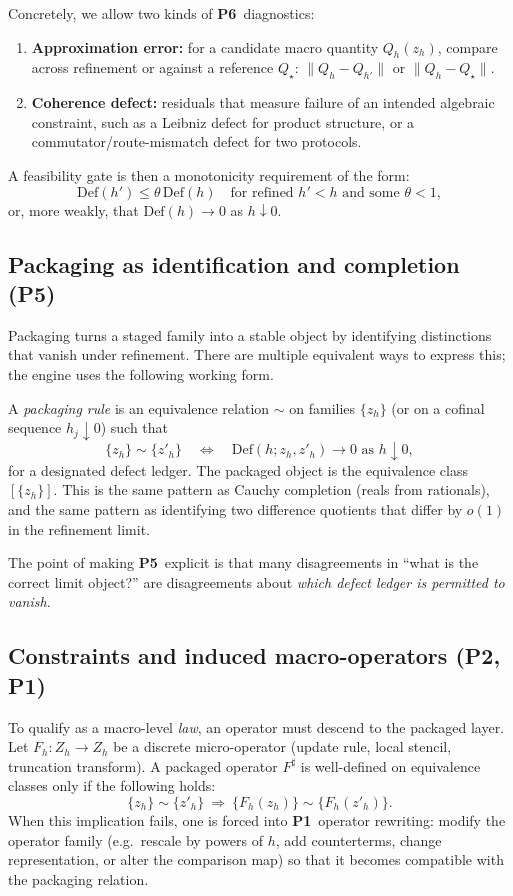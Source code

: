 \documentclass[apajournal,article,submit,moreauthors,pdftex]{Definitions/mdpi}
\newcommand{\Pone}{\textbf{P1}}
\newcommand{\Ptwo}{\textbf{P2}}
\newcommand{\Pfive}{\textbf{P5}}
\newcommand{\Psix}{\textbf{P6}}
\begin{document}
Concretely, we allow two kinds of \Psix\ diagnostics:
\begin{enumerate}
  \item \textbf{Approximation error:} for a candidate macro quantity $Q_h(z_h)$, compare across refinement or against a reference $Q_\star$:
  $\|Q_h-Q_{h'}\|$ or $\|Q_h-Q_\star\|$.
  \item \textbf{Coherence defect:} residuals that measure failure of an intended algebraic constraint, such as a Leibniz defect for product structure, or a commutator/route-mismatch defect for two protocols.
\end{enumerate}
A feasibility gate is then a monotonicity requirement of the form:
\[
\mathrm{Def}(h') \le \theta\,\mathrm{Def}(h)
\quad\text{for refined }h'<h\text{ and some }\theta<1,
\]
or, more weakly, that $\mathrm{Def}(h)\to 0$ as $h\downarrow 0$.

\subsection{Packaging as identification and completion (\Pfive)}
Packaging turns a staged family into a stable object by identifying distinctions that vanish under refinement.
There are multiple equivalent ways to express this; the engine uses the following working form.

A \emph{packaging rule} is an equivalence relation $\sim$ on families $\{z_h\}$ (or on a cofinal sequence $h_j\downarrow 0$) such that
\[
\{z_h\}\sim \{z'_h\}
\quad\Longleftrightarrow\quad
\mathrm{Def}(h;z_h,z'_h)\to 0
\text{ as }h\downarrow 0,
\]
for a designated defect ledger.
The packaged object is the equivalence class $[\{z_h\}]$.
This is the same pattern as Cauchy completion (reals from rationals), and the same pattern as identifying two difference quotients that differ by $o(1)$ in the refinement limit.

The point of making \Pfive\ explicit is that many disagreements in ``what is the correct limit object?'' are disagreements about \emph{which defect ledger is permitted to vanish}.

\subsection{Constraints and induced macro-operators (\Ptwo, \Pone)}
To qualify as a macro-level \emph{law}, an operator must descend to the packaged layer.
Let $F_h:Z_h\to Z_h$ be a discrete micro-operator (update rule, local stencil, truncation transform).
A packaged operator $F^\sharp$ is well-defined on equivalence classes only if the following holds:
\[
\{z_h\}\sim \{z'_h\}
\ \Longrightarrow\
\{F_h(z_h)\}\sim \{F_h(z'_h)\}.
\]
When this implication fails, one is forced into \Pone\ operator rewriting:
modify the operator family (e.g.\ rescale by powers of $h$, add counterterms, change representation, or alter the comparison map) so that it becomes compatible with the packaging relation.
\end{document}
